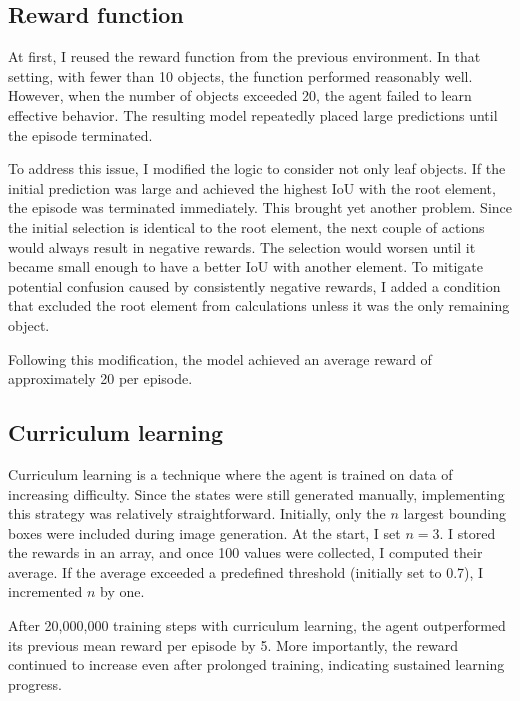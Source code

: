 \documentclass[
  digital,     %
  oneside,     %
  nosansbold,  %
  nocolorbold, %
  lof,         %
  lot,         %
]{fithesis4}
\begin{document}
\subsection{Reward function}

At first, I reused the reward function from the previous environment. In that setting, with fewer than 10 objects, the function performed reasonably well. However, when the number of objects exceeded 20, the agent failed to learn effective behavior. The resulting model repeatedly placed large predictions until the episode terminated.

To address this issue, I modified the logic to consider not only leaf objects. If the initial prediction was large and achieved the highest IoU with the root element, the episode was terminated immediately. This brought yet another problem. Since the initial selection is identical to the root element, the next couple of actions would always result in negative rewards. The selection would worsen until it became small enough to have a better IoU with another element. To mitigate potential confusion caused by consistently negative rewards, I added a condition that excluded the root element from calculations unless it was the only remaining object.

Following this modification, the model achieved an average reward of approximately 20 per episode.

\subsection{Curriculum learning}

Curriculum learning is a technique where the agent is trained on data of increasing difficulty. Since the states were still generated manually, implementing this strategy was relatively straightforward. Initially, only the $n$ largest bounding boxes were included during image generation. At the start, I set $n=3$. I stored the rewards in an array, and once 100 values were collected, I computed their average. If the average exceeded a predefined threshold (initially set to 0.7), I incremented $n$ by one.

After 20,000,000 training steps with curriculum learning, the agent outperformed its previous mean reward per episode by 5. More importantly, the reward continued to increase even after prolonged training, indicating sustained learning progress.
\end{document}
